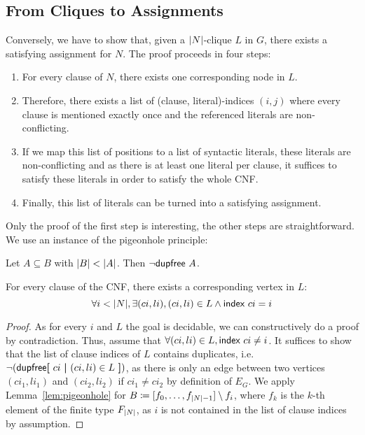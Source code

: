 \subsection{From Cliques to Assignments}
Conversely, we have to show that, given a $|N|$-clique $L$ in $G$, there exists a satisfying assignment for $N$. The proof proceeds in four steps:
\begin{enumerate}
  \item For every clause of $N$, there exists one corresponding node in $L$.
  \item Therefore, there exists a list of (clause, literal)-indices $(i, j)$ where every clause is mentioned exactly once and the referenced literals are non-conflicting. 
  \item If we map this list of positions to a list of syntactic literals, these literals are non-conflicting and as there is at least one literal per clause, it suffices to satisfy these literals in order to satisfy the whole CNF.
  \item Finally, this list of literals can be turned into a satisfying assignment.
\end{enumerate}

Only the proof of the first step is interesting, the other steps are straightforward.
We use an instance of the pigeonhole principle: 
\begin{lemma}\label{lem:pigeonhole}
  Let $A \subseteq B$ with $|B| < |A|$. Then $\lnot \textsf{dupfree}~A$. 
\end{lemma}

\begin{lemma}
  For every clause of the CNF, there exists a corresponding vertex in $L$:
  \[\forall i < |N|, \exists (ci, li), (ci, li) \in L \land \textsf{index}~ci = i \]
\end{lemma}
\begin{proof}
  As for every $i$ and $L$ the goal is decidable, we can constructively do a proof by contradiction. Thus, assume that $\forall (ci, li) \in L, \textsf{index}~ci \neq i$. It suffices to show that the list of clause indices of $L$ contains duplicates, i.e. $\lnot (\textsf{dupfree} \textbf{[}~ ci ~\textbf{|}~ (ci, li) \in L ~\textbf{]})$, as there is only an edge between two vertices $(ci_1, li_1)$ and $(ci_2, li_2)$ if $ci_1 \neq ci_2$ by definition of $E_G$. 
  We apply Lemma~\ref{lem:pigeonhole} for $B \coloneqq [f_0, \ldots, f_{|N| -1}] \setminus f_i$, where $f_k$ is the $k$-th element of the finite type $F_{|N|}$, as $i$ is not contained in the list of clause indices by assumption. 
\end{proof}

